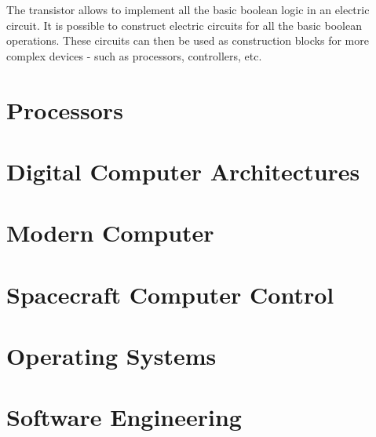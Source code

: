 The transistor allows to implement all the basic boolean logic in an electric circuit. It is possible to construct electric circuits for all the basic boolean operations. These circuits can then be used as construction blocks for more complex devices - such as processors, controllers, etc.






\section{Processors}







\section{Digital Computer Architectures}







\section{Modern Computer}







\section{Spacecraft Computer Control}







\section{Operating Systems}







\section{Software Engineering}
